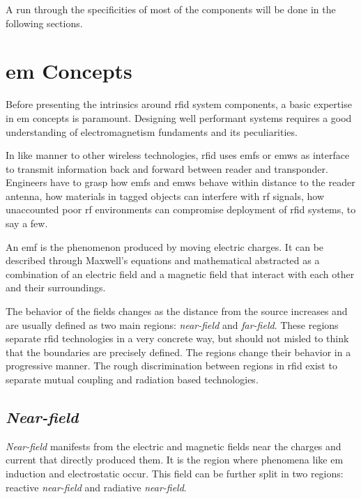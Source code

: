 A run through the specificities of most of the components will be done in the following sections.

\section{\acl{em} Concepts} \label{sec:em}


Before presenting the intrinsics around \ac{rfid} system components, a basic expertise in \ac{em} concepts is paramount.
Designing well performant systems requires a good understanding of electromagnetism fundaments and its peculiarities.

In like manner to other wireless technologies, \ac{rfid} uses \acp{emf} or \acp{emw} as interface to transmit information back and forward between reader and transponder.
Engineers have to grasp how \acp{emf} and \acp{emw} behave within distance to the reader antenna, how materials in tagged objects can interfere with \ac{rf} signals, how unaccounted poor \ac{rf} environments can compromise deployment of \ac{rfid} systems, to say a few.

An \ac{emf} is the phenomenon produced by moving electric charges. It can be described through Maxwell's equations and mathematical abstracted as a combination of an electric field and a magnetic field that interact with each other and their surroundings.

The behavior of the fields changes as the distance from the source increases and are usually defined as two main regions: \emph{near-field} and \emph{far-field}. These regions separate \ac{rfid} technologies in a very concrete way, but should not misled to think that the boundaries are precisely defined. The regions change their behavior in a progressive manner. The rough discrimination between regions in \ac{rfid} exist to separate mutual coupling and radiation based technologies. 

\subsection{\emph{Near-field}}

\emph{Near-field} manifests from the electric and magnetic fields near the charges and current that directly produced them. It is the region where phenomena like \ac{em} induction and electrostatic occur.
This field can be further split in two regions: reactive \emph{near-field} and radiative \emph{near-field}.

